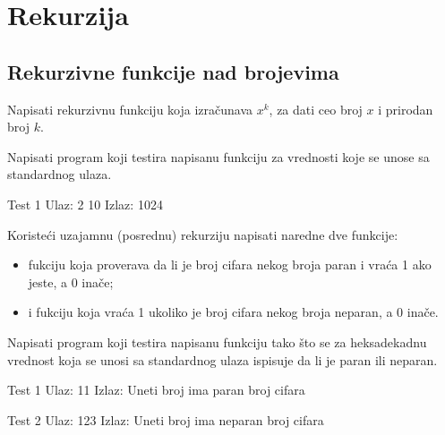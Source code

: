 \section{Rekurzija}

\subsection{Rekurzivne funkcije nad brojevima}

\begin{Exercise}[label=102]
Napisati rekurzivnu funkciju koja izračunava  $x^k$,  za dati ceo broj $x$ i prirodan broj $k$.

Napisati program koji testira napisanu funkciju za vrednosti koje se unose sa standardnog ulaza.
 
\begin{minitest}
\begin{test}{Test 1}
Ulaz:   2 10
Izlaz:  1024
\end{test}
\end{minitest}
\end{Exercise}
\begin{Answer}[ref=102]
\end{Answer}

\begin{Exercise}[label=104]
 Koristeći uzajamnu (posrednu) rekurziju napisati naredne dve funkcije:
 \begin{itemize}
\item fukciju  koja proverava da li je broj cifara nekog broja paran i vraća 1 ako jeste, a 0 inače;
\item i fukciju  koja vraća 1 ukoliko je broj cifara nekog broja neparan, a 0 inače.
 \end{itemize}
 Napisati program koji testira napisanu funkciju tako što se za heksadekadnu vrednost koja se unosi sa standardnog ulaza ispisuje da li je paran ili neparan.
 
\begin{miditest}
\begin{test}{Test 1}
Ulaz:  11
Izlaz: Uneti broj ima paran broj cifara
\end{test}
\end{miditest}

\begin{miditest}
\begin{test}{Test 2}
Ulaz:  123
Izlaz: Uneti broj ima neparan broj cifara
\end{test}
\end{miditest}

\end{Exercise}
\begin{Answer}[ref=104]
\end{Answer}

